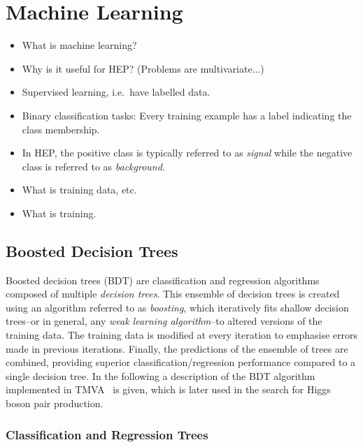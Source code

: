 \section{Machine Learning}

\begin{itemize}
\item What is machine learning?

\item Why is it useful for HEP? (Problems are multivariate...)

\item Supervised learning, i.e.\ have labelled data.

\item Binary classification tasks: Every training example has a label indicating
  the class membership.

\item In HEP, the positive class is typically referred to as \emph{signal} while
  the negative class is referred to as \emph{background}.

\item What is training data, etc.

\item What is training.
\end{itemize}


\subsection{Boosted Decision Trees}

Boosted decision trees (BDT) are classification and regression algorithms
composed of multiple \emph{decision trees}. This ensemble of decision trees is
created using an algorithm referred to as \emph{boosting}, which iteratively
fits shallow decision trees--or in general, any \emph{weak learning
  algorithm}--to altered versions of the training data. The training data is
modified at every iteration to emphasise errors made in previous
iterations. Finally, the predictions of the ensemble of trees are combined,
providing superior classification/regression performance compared to a single
decision tree. In the following a description of the BDT algorithm implemented
in \textsc{TMVA}~\cite{TMVA} is given, which is later used in the search for
Higgs boson pair production.


\subsubsection{Classification and Regression Trees}

